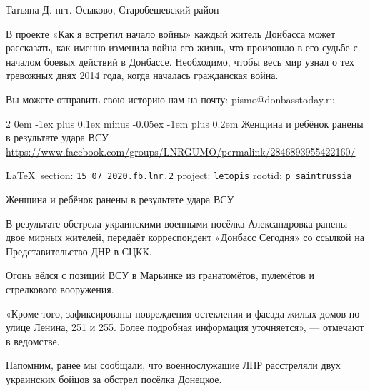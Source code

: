 \documentclass[a4paper,11pt]{extreport}
\makeatletter
\renewcommand\subsection{%
  \clearpage
    \@startsection{subsection}%
    {2}%
    {0em}%
    {-1ex plus 0.1ex minus -0.05ex}%
    {-1em plus 0.2em}%
    {\scshape\bfseries\Large}%
}
\makeatother
\begin{document}
Татьяна Д. пгт. Осыково, Старобешевский район

В проекте «Как я встретил начало войны» каждый житель Донбасса может
рассказать, как именно изменила война его жизнь, что произошло в его судьбе с
началом боевых действий в Донбассе. Необходимо, чтобы весь мир узнал о тех
тревожных днях 2014 года, когда началась гражданская война.

Вы можете отправить свою историю нам на почту: pismo@donbasstoday.ru
 
 

\subsection{Женщина и ребёнок ранены в результате удара ВСУ}
\label{sec:15_07_2020.fb.lnr.2}
\url{https://www.facebook.com/groups/LNRGUMO/permalink/2846893955422160/}


\cite{15_07_2020.fb.lnr.2}
  
\vspace{0.5cm}
{\ifDEBUG\small\LaTeX~section: \verb|15_07_2020.fb.lnr.2| project: \verb|letopis| rootid: \verb|p_saintrussia|\fi
}
\vspace{0.5cm}

Женщина и ребёнок ранены в результате удара ВСУ

В результате обстрела украинскими военными посёлка Александровка ранены двое
мирных жителей, передаёт корреспондент «Донбасс Сегодня» со ссылкой на
Представительство ДНР в СЦКК.

Огонь вёлся с позиций ВСУ в Марьинке из гранатомётов, пулемётов и стрелкового
вооружения.

«Кроме того, зафиксированы повреждения остекления и фасада жилых домов по улице
Ленина, 251 и 255. Более подробная информация уточняется», --- отмечают в
ведомстве.

Напомним, ранее мы сообщали, что военнослужащие ЛНР расстреляли двух украинских
бойцов за обстрел посёлка Донецкое.
  
 
\end{document}
